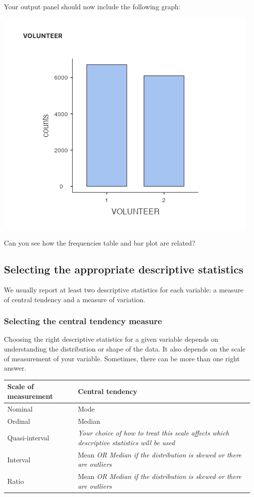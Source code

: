 \documentclass[
]{book}
\begin{document}
Your output panel should now include the following graph:

\includegraphics{img/barplotvolunteer.png}

Can you see how the frequencies table and bar plot are related?

\hypertarget{selecting-the-appropriate-descriptive-statistics}{%
\subsection{Selecting the appropriate descriptive statistics}\label{selecting-the-appropriate-descriptive-statistics}}

We usually report at least two descriptive statistics for each variable: a measure of central tendency and a measure of variation.

\hypertarget{selecting-the-central-tendency-measure}{%
\subsubsection{Selecting the central tendency measure}\label{selecting-the-central-tendency-measure}}

Choosing the right descriptive statistics for a given variable depends on understanding the distribution or shape of the data. It also depends on the scale of measurement of your variable. Sometimes, there can be more than one right answer.

\begin{longtable}[]{@{}ll@{}}
\toprule\noalign{}
Scale of measurement & Central tendency \\
\midrule\noalign{}
\endhead
\bottomrule\noalign{}
\endlastfoot
Nominal & Mode \\
Ordinal & Median \\
Quasi-interval & \emph{Your choice of how to treat this scale affects which descriptive statistics will be used} \\
Interval & Mean \emph{OR Median if the distribution is skewed or there are outliers} \\
Ratio & Mean \emph{OR Median if the distribution is skewed or there are outliers} \\
\end{longtable}
\end{document}
